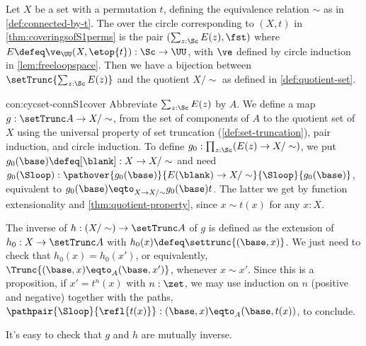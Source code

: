 \begin{construction}\label{con:cycset-connS1cover}
Let $X$ be a set with a permutation $t$, defining the equivalence
relation $\sim$ as in \cref{def:connected-by-t}.
The \covering over the circle corresponding to $(X,t)$ in
\cref{thm:coveringsofS1perms} is the pair $(\sum_{z:\Sc} E(z),\fst)$
where $E\defeq\ve_\UU(X,\etop{t}) : \Sc\to\UU$, with $\ve$ defined by
circle induction in \cref{lem:freeloopspace}.
Then we have a bijection between $\setTrunc{\sum_{z:\Sc} E(z)}$ and 
the quotient $X/\sim$ as defined in \cref{def:quotient-set}.
\end{construction}
\begin{implementation}{con:cycset-connS1cover}
Abbreviate $\sum_{z:\Sc} E(z)$ by $A$. We define a map
$g : \setTrunc A \to X/\sim$, from the set of components of $A$
to the quotient set of $X$ using the universal property of set 
truncation (\cref{def:set-truncation}), pair induction, and circle induction.
To define $g_0 : \prod_{z:\Sc}(E(z) \to X/\sim)$, we put
$g_0(\base)\defeq[\blank] : X \to X/\sim$ and need
$g_0(\Sloop) : \pathover{g_0(\base)}{E(\blank) \to X/\sim}{\Sloop}{g_0(\base)}$,
equivalent to $g_0(\base) \eqto_{X \to X/\sim} g_0(\base)t$.
The latter we get by function extensionality and \cref{thm:quotient-property},
since $x \sim t(x)$ for any $x:X$.

  The inverse of $h:(X/\sim) \to \setTrunc A$ of $g$
  is defined as the extension of $h_0 : X \to \setTrunc A$
  with $h_0(x) \defeq \settrunc{(\base,x)}$.
  We just need to check that $h_0(x) = h_0(x')$, or equivalently,
  $\Trunc{(\base,x)\eqto_A(\base,x')}$, whenever $x\sim x'$.
  Since this is a proposition, if $x'=t^n(x)$ with $n:\zet$,
  we may use induction on $n$ (positive and negative)
  together with the paths,
  $\pathpair{\Sloop}{\refl{t(x)}} : (\base,x)\eqto_A(\base,t(x))$,
  to conclude.

  It's easy to check that $g$ and $h$ are mutually inverse.
\end{implementation}

